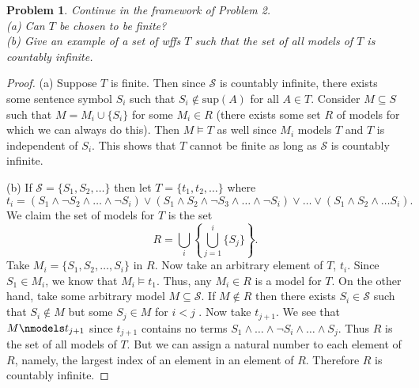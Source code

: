 \documentclass{article}
\newtheorem{problem}{Problem}
\begin{document}
\begin{problem}
Continue in the framework of Problem 2.\\
(a) Can $T$ be chosen to be finite?\\
(b) Give an example of a set of wffs $T$ such that the set of all models of $T$ is countably infinite.
\end{problem}
\begin{proof}
(a) Suppose $T$ is finite. Then since $\mathcal{S}$ is countably infinite, there exists some sentence symbol $S_i$ such that $S_i \notin \text{sup}(A)$ for all $A \in T$. Consider $M \subseteq S$ such that $M = M_i \cup \{S_i\}$ for some $M_i \in R$ (there exists some set $R$ of models for which we can always do this). Then $M \models T$ as well since $M_i$ models $T$ and $T$ is independent of $S_i$. This shows that $T$ cannot be finite as long as $\mathcal{S}$ is countably infinite.

(b) If $\mathcal{S} = \{S_1, S_2, \dots\}$ then let $T = \{t_1, t_2, \dots\}$ where
\[
t_i = (S_1 \wedge \neg S_2 \wedge \dots \wedge \neg S_i) \vee (S_1 \wedge S_2 \wedge \neg S_3 \wedge \dots \wedge \neg S_i) \vee \dots \vee (S_1 \wedge S_2 \wedge \dots S_i).
\]
We claim the set of models for $T$ is the set
\[
R = \bigcup_i \left \{  \bigcup_{j=1}^i \{ S_j \} \right \}.
\]
Take $M_i = \{S_1, S_2, \dots , S_i\}$ in $R$. Now take an arbitrary element of $T$, $t_i$. Since $S_1 \in M_i$, we know that $M_i \models t_1$. Thus, any $M_i \in R$ is a model for $T$. On the other hand, take some arbitrary model $M \subseteq \mathcal{S}$. If $M \notin R$ then there exists $S_i \in \mathcal{S}$ such that $S_i \notin M$ but some $S_j \in M$ for $i < j$ . Now take $t_{j+1}$. We see that $M \nmodels t_{j+1}$ since $t_{j+1}$ contains no terms $S_1 \wedge \dots \wedge \neg S_i \wedge \dots \wedge S_j$. Thus $R$ is the set of all models of $T$. But we can assign a natural number to each element of $R$, namely, the largest index of an element in an element of $R$. Therefore $R$ is countably infinite.
\end{proof}
\end{document}
